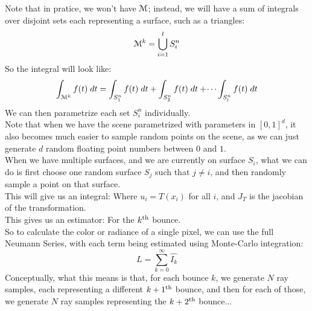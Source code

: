 \documentclass[12pt]{article}
\begin{document}
Note that in pratice, we won't have $\mathcal{M}$;
instead, we will have a sum of integrals 
over disjoint sets each
representing a surface, such as a triangles:
\[ \mathcal{M}^k = \bigcup_{i=1}^l S_i^n \]
So the integral will look like:
\[ \int_{\mathcal{M}^k} f(t)\;dt
= \int_{S_1^n} f(t)\;dt + \int_{S_2^n} f(t)\;dt +
\dots \int_{S_l^n} f(t)\;dt \]
We can then parametrize each set $S_i^n$ individually. \\

Note that when we have the scene parametrized
with parameters in $[0, 1]^d$, it also becomes
much easier to sample random points on the scene,
as we can just generate $d$ random floating point
numbers between $0$ and $1$. \\

When we have multiple surfaces,
and we are currently on surface $S_i$,
what we can do is first choose one random surface
$S_j$ such that $j \neq i$, and then randomly
sample a point on that surface. \\

This will give us an integral:
Where $u_i = T(x_i)$ for all $i$, and $J_T$
is the jacobian of the transformation. \\

This gives us an estimator:
For the $k^{\text{th}}$ bounce. \\

So to calculate the color or radiance of a single pixel,
we can use the full Neumann Series, with each term
being estimated using Monte-Carlo integration:
\[ L = \sum_{k=0}^\infty \widehat{I_k} \]
Conceptually, what this means is that, for each
bounce $k$, we generate $N$ ray samples,
each representing a different $k+1^{\text{th}}$ bounce,
and then for each of those, we generate
$N$ ray samples representing the $k+2^{\text{th}}$ bounce... \\
\end{document}
